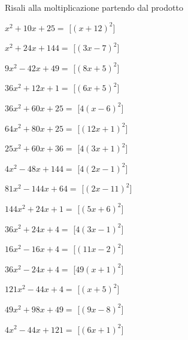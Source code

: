 \begin{esercizio}
 \label{ese:11.11}
Risali alla moltiplicazione partendo dal prodotto

\begin{multicols}{2}
\begin{enumeratea}
\spazielenx
\item \(x^{2} + 10 x + 25=\) 
\hfill [\(\left(x + 12\right)^{2}\)]
\item \(x^{2} + 24 x + 144=\) 
\hfill [\(\left(3 x - 7\right)^{2}\)]
\item \(9 x^{2} - 42 x + 49=\) 
\hfill [\(\left(8 x + 5\right)^{2}\)]
\item \(36 x^{2} + 12 x + 1=\) 
\hfill [\(\left(6 x + 5\right)^{2}\)]
\item \(36 x^{2} + 60 x + 25=\) 
\hfill [\(4 \left(x - 6\right)^{2}\)]
\item \(64 x^{2} + 80 x + 25=\) 
\hfill [\(\left(12 x + 1\right)^{2}\)]
\item \(25 x^{2} + 60 x + 36=\) 
\hfill [\(4 \left(3 x + 1\right)^{2}\)]
\item \(4 x^{2} - 48 x + 144=\) 
\hfill [\(4 \left(2 x - 1\right)^{2}\)]
\item \(81 x^{2} - 144 x + 64=\) 
\hfill [\(\left(2 x - 11\right)^{2}\)]
\item \(144 x^{2} + 24 x + 1=\) 
\hfill [\(\left(5 x + 6\right)^{2}\)]
\item \(36 x^{2} + 24 x + 4=\) 
\hfill [\(4 \left(3 x - 1\right)^{2}\)]
\item \(16 x^{2} - 16 x + 4=\) 
\hfill [\(\left(11 x - 2\right)^{2}\)]
\item \(36 x^{2} - 24 x + 4=\) 
\hfill [\(49 \left(x + 1\right)^{2}\)]
\item \(121 x^{2} - 44 x + 4=\) 
\hfill [\(\left(x + 5\right)^{2}\)]
\item \(49 x^{2} + 98 x + 49=\) 
\hfill [\(\left(9 x - 8\right)^{2}\)]
\item \(4 x^{2} - 44 x + 121=\) 
\hfill [\(\left(6 x + 1\right)^{2}\)]

\end{enumeratea}
\end{multicols}
\end{esercizio}

